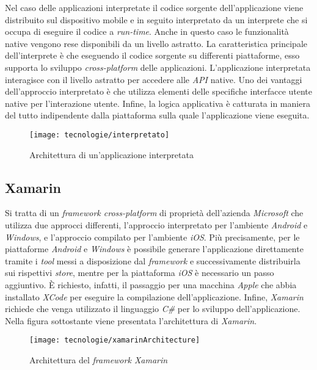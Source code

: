 Nel caso delle applicazioni interpretate il codice sorgente dell'applicazione viene distribuito sul dispositivo mobile e in seguito interpretato da un interprete che si occupa di eseguire il codice a \textit{run-time}. Anche in questo caso le funzionalità native vengono rese disponibili da un livello astratto. La caratteristica principale dell'interprete è che eseguendo il codice sorgente su differenti piattaforme, esso supporta lo sviluppo \textit{cross-platform} delle applicazioni. L'applicazione interpretata interagisce con il livello astratto per accedere alle \textit{API} native. Uno dei vantaggi dell'approccio interpretato è che utilizza elementi delle specifiche interfacce utente native per l'interazione utente. Infine, la logica applicativa è catturata in maniera del tutto indipendente dalla piattaforma sulla quale l'applicazione viene eseguita.

\begin{figure}[!h] 
    \centering 
    \texttt{[image: tecnologie/interpretato]} 
    \caption{Architettura di un'applicazione interpretata}
\end{figure}

\newpage

\subsection{Xamarin}

Si tratta di un \textit{framework cross-platform} di proprietà dell'azienda \textit{Microsoft} che utilizza due approcci differenti, l'approccio interpretato per l'ambiente \textit{Android} e \textit{Windows}, e l'approccio compilato per l'ambiente \textit{iOS}. Più precisamente, per le piattaforme \textit{Android} e \textit{Windows} è possibile generare l'applicazione direttamente tramite i \textit{tool} messi a disposizione dal \textit{framework} e successivamente distribuirla sui rispettivi \textit{store}, mentre per la piattaforma \textit{iOS} è necessario un passo aggiuntivo. È richiesto, infatti, il passaggio per una macchina \textit{Apple} che abbia installato \textit{XCode} per eseguire la compilazione dell'applicazione. Infine, \textit{Xamarin} richiede che venga utilizzato il linguaggio \textit{C\#} per lo sviluppo dell'applicazione. Nella figura sottostante viene presentata l'architettura di \textit{Xamarin}.

\begin{figure}[!h] 
    \centering 
    \texttt{[image: tecnologie/xamarinArchitecture]} 
    \caption{Architettura del \textit{framework Xamarin}}
\end{figure}


